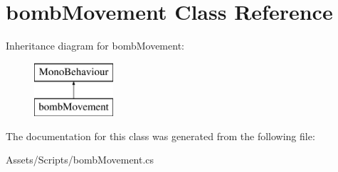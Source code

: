 \hypertarget{classbomb_movement}{}\section{bomb\+Movement Class Reference}
\label{classbomb_movement}
Inheritance diagram for bomb\+Movement\+:\begin{figure}[H]
\begin{center}
\leavevmode
\includegraphics[height=2.000000cm]{classbomb_movement}
\end{center}
\end{figure}


The documentation for this class was generated from the following file\+:\begin{DoxyCompactItemize}
\item 
Assets/\+Scripts/bomb\+Movement.\+cs\end{DoxyCompactItemize}

